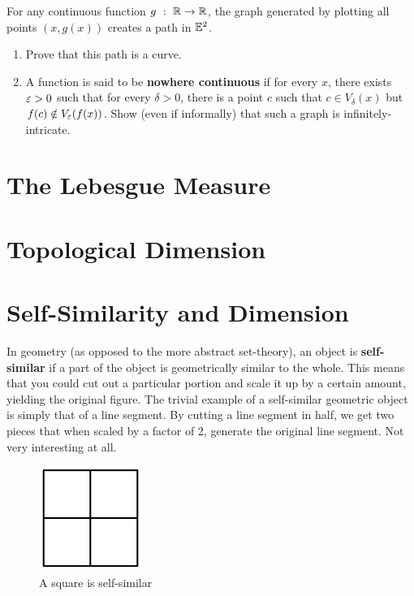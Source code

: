 \begin{exercise}
    For any continuous function $g\ :\ \R\to\R$, the graph generated by plotting all points $(x,g(x))$ creates a path in $\mathbb{E}^2$. 
    \begin{enumerate}
        \item Prove that this path is a curve.
        \item A function is said to be \textbf{nowhere continuous} if for every $x$, there exists $\varepsilon>0$ such that for every $\delta>0$, there is a point $c$ such that $c\in V_\delta(x)$ but $ f(c)\notin V_\varepsilon(f(x))$. Show (even if informally) that such a graph is infinitely-intricate.
    \end{enumerate}
\end{exercise}

\section{The Lebesgue Measure}
\Blindtext

\section{Topological Dimension}
\Blindtext

\clearpage

\section{Self-Similarity and Dimension}

In geometry (as opposed to the more abstract set-theory), an object is \textbf{self-similar} if a part of the object is geometrically similar to the whole. This means that you could cut out a particular portion and scale it up by a certain amount, yielding the original figure. The trivial example of a self-similar geometric object is simply that of a line segment. By cutting a line segment in half, we get two pieces that when scaled by a factor of 2, generate the original line segment. Not very interesting at all.\\

\begin{figure}
  \begin{center}
    \includegraphics[width=0.3\textwidth]{Images/1.4.1.jpg}
  \end{center}
  \caption{A square is self-similar}
\end{figure}

